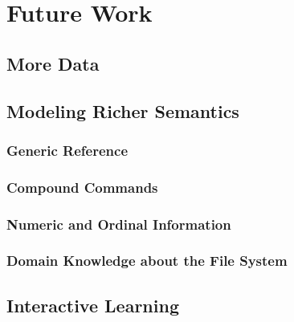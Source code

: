 \section{Future Work}

\subsection{More Data}
\subsection{Modeling Richer Semantics}
\label{future:semantics}
\subsubsection{Generic Reference}
\subsubsection{Compound Commands}
\subsubsection{Numeric and Ordinal Information}
\subsubsection{Domain Knowledge about the File System}

\subsection{Interactive Learning}